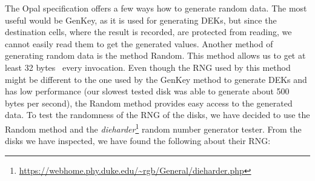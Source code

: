 \REPLACEME

The Opal specification offers a few ways how to generate random data. The most useful would be GenKey, as it is used for generating DEKs, but since the destination cells, where the result is recorded, are protected from reading, we cannot easily read them to get the generated values.
Another method of generating random data is the method Random. This method allows us to get at least 32 bytes~\cite{tcg-opal2} every invocation. Even though the RNG used by this method might be different to the one used by the GenKey method to generate DEKs and has low performance (our slowest tested disk was able to generate about 500 bytes per second), the Random method provides easy access to the generated data.
To test the randomness of the RNG of the disks, we have decided to use the Random method and the \emph{dieharder}\footnote{\url{https://webhome.phy.duke.edu/~rgb/General/dieharder.php}} random number generator tester.
From the disks we have inspected, we have found the following about their RNG:
